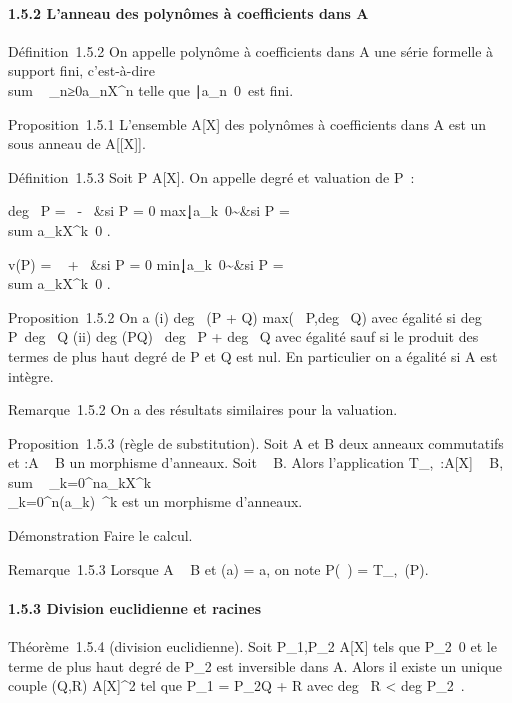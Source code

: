 \paragraph{1.5.2 L'anneau des polynômes à coefficients dans A}

Définition~1.5.2 On appelle polynôme à coefficients dans A une série
formelle à support fini, c'est-à-dire
\\sum ~
_n≥0a_nX^n telle que
\n∣a_n\mathrel\neq~0\
est fini.

Proposition~1.5.1 L'ensemble A{[}X{]} des polynômes à coefficients dans
A est un sous anneau de A{[}{[}X{]}{]}.

Définition~1.5.3 Soit P \in A{[}X{]}. On appelle degré et valuation de P~:

deg~ P = \left
\ \cases -\infty~ &si P = 0
\cr
max\k∣a_k\mathrel\neq~0\~&si
P = \\sum
a_kX^k\neq~0 
\right .

v(P) = \left \ \cases
+\infty~ &si P = 0 \cr
min\k∣a_k\mathrel\neq~0\~&si
P = \\sum
a_kX^k\neq~0 
\right .

Proposition~1.5.2 On a (i) deg~ (P + Q)
\leq max(\deg~
P,deg~ Q) avec égalité si
deg~
P\neq~deg~ Q (ii)
deg (PQ) \leq\ deg~ P
+ deg~ Q avec égalité sauf si le produit des
termes de plus haut degré de P et Q est nul. En particulier on a égalité
si A est intègre.

Remarque~1.5.2 On a des résultats similaires pour la valuation.

Proposition~1.5.3 (règle de substitution). Soit A et B deux anneaux
commutatifs et \phi:A \rightarrow~ B un morphisme d'anneaux. Soit \beta~ \in B. Alors
l'application T_\phi,\beta~:A{[}X{]} \rightarrow~ B,
\\sum ~
_k=0^na_kX^k\mapsto~\\\sum
 _k=0^n\phi(a_k)\beta~^k est un morphisme
d'anneaux.

Démonstration Faire le calcul.

Remarque~1.5.3 Lorsque A \subset~ B et \phi(a) = a, on note P(\beta~) =
T_\phi,\beta~(P).

\paragraph{1.5.3 Division euclidienne et racines}

Théorème~1.5.4 (division euclidienne). Soit P_1,P_2 \in
A{[}X{]} tels que P_2\neq~0 et le terme
de plus haut degré de P_2 est inversible dans A. Alors il
existe un unique couple (Q,R) \in A{[}X{]}^2 tel que
P_1 = P_2Q + R avec deg~ R
\textless{} deg P_2~.

